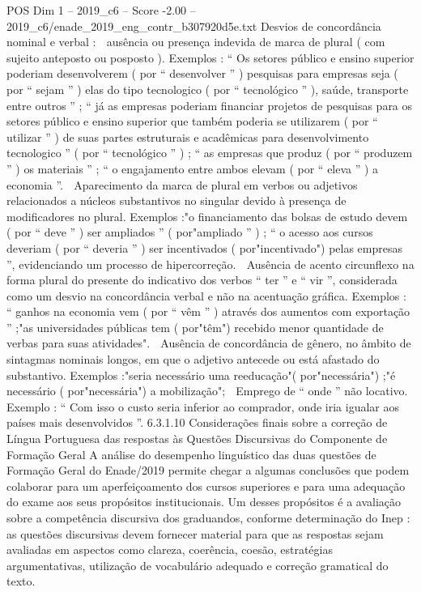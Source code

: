 \begin{textsample}{POS Dim 1 – 2019\_c6 – Score -2.00 – 2019\_c6/enade\_2019\_eng\_contr\_b307920d5e.txt}
Desvios de concordância nominal e verbal :  ausência ou presença indevida de marca de plural ( com sujeito anteposto ou posposto ).
Exemplos : “ Os setores público e ensino superior poderiam desenvolverem ( por “ desenvolver ” ) pesquisas para empresas seja ( por “ sejam ” ) elas do tipo tecnologico ( por “ tecnológico ” ), saúde, transporte entre outros ” ; “ já as empresas poderiam financiar projetos de pesquisas para os setores público e ensino superior que também poderia se utilizarem ( por “ utilizar ” ) de suas partes estruturais e acadêmicas para desenvolvimento tecnologico ” ( por “ tecnológico ” ) ; “ as empresas que produz ( por “ produzem ” ) os materiais ” ; “ o engajamento entre ambos elevam ( por “ eleva ” ) a economia ”.  Aparecimento da marca de plural em verbos ou adjetivos relacionados a núcleos substantivos no singular devido à presença de modificadores no plural.
Exemplos :"o financiamento das bolsas de estudo devem ( por “ deve ” ) ser ampliados ” ( por"ampliado ” ) ; “ o acesso aos cursos deveriam ( por “ deveria ” ) ser incentivados ( por"incentivado") pelas empresas ”, evidenciando um processo de hipercorreção.  Ausência de acento circunflexo na forma plural do presente do indicativo dos verbos “ ter ” e “ vir ”, considerada como um desvio na concordância verbal e não na acentuação gráfica.
Exemplos : “ ganhos na economia vem ( por “ vêm ” ) através dos aumentos com exportação ” ;"as universidades públicas tem ( por"têm") recebido menor quantidade de verbas para suas atividades".  Ausência de concordância de gênero, no âmbito de sintagmas nominais longos, em que o adjetivo antecede ou está afastado do substantivo.
Exemplos :"seria necessário uma reeducação"( por"necessária") ;"é necessário ( por"necessária") a mobilização";  Emprego de “ onde ” não locativo.
Exemplo : “ Com isso o custo seria inferior ao comprador, onde iria igualar aos países mais desenvolvidos ”. 6.3.1.10 Considerações finais sobre a correção de Língua Portuguesa das respostas às Questões Discursivas do Componente de Formação Geral A análise do desempenho linguístico das duas questões de Formação Geral do Enade/2019 permite chegar a algumas conclusões que podem colaborar para um aperfeiçoamento dos cursos superiores e para uma adequação do exame aos seus propósitos institucionais.
Um desses propósitos é a avaliação sobre a competência discursiva dos graduandos, conforme determinação do Inep : as questões discursivas devem fornecer material para que as respostas sejam avaliadas em aspectos como clareza, coerência, coesão, estratégias argumentativas, utilização de vocabulário adequado e correção gramatical do texto.

\end{textsample}
